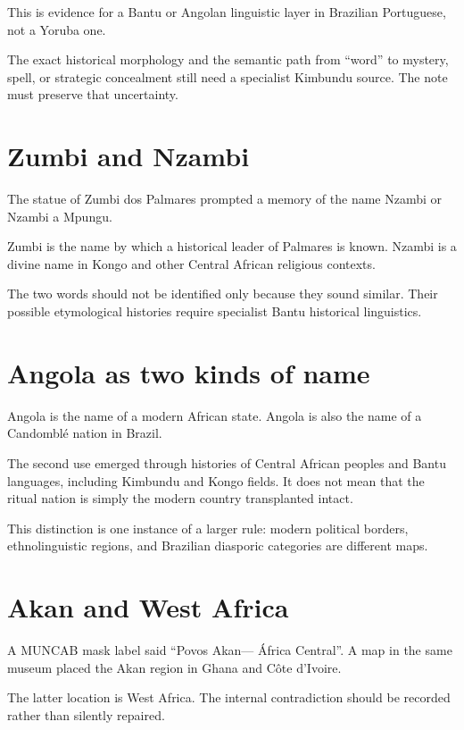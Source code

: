This is evidence for a Bantu or Angolan
linguistic layer in Brazilian Portuguese,
not a Yoruba one.

The exact historical morphology and the
semantic path from ``word'' to mystery,
spell, or strategic concealment still need
a specialist Kimbundu source.  The note
must preserve that uncertainty.

\section{Zumbi and Nzambi}
\label{section-languages-zumbi-nzambi}

The statue of Zumbi dos Palmares prompted
a memory of the name Nzambi or Nzambi a
Mpungu.

Zumbi is the name by which a historical
leader of Palmares is known.  Nzambi is a
divine name in Kongo and other Central
African religious contexts.

The two words should not be identified
only because they sound similar.  Their
possible etymological histories require
specialist Bantu historical linguistics.

\section{Angola as two kinds of name}
\label{section-languages-angola}

Angola is the name of a modern African
state.  Angola is also the name of a
Candombl\'e nation in Brazil.

The second use emerged through histories
of Central African peoples and Bantu
languages, including Kimbundu and Kongo
fields.  It does not mean that the ritual
nation is simply the modern country
transplanted intact.

This distinction is one instance of a
larger rule: modern political borders,
ethnolinguistic regions, and Brazilian
diasporic categories are different maps.

\section{Akan and West Africa}
\label{section-languages-akan}

A MUNCAB mask label said ``Povos Akan---
\'Africa Central''.  A map in the same
museum placed the Akan region in Ghana and
C\^ote d'Ivoire.

The latter location is West Africa.  The
internal contradiction should be recorded
rather than silently repaired.

